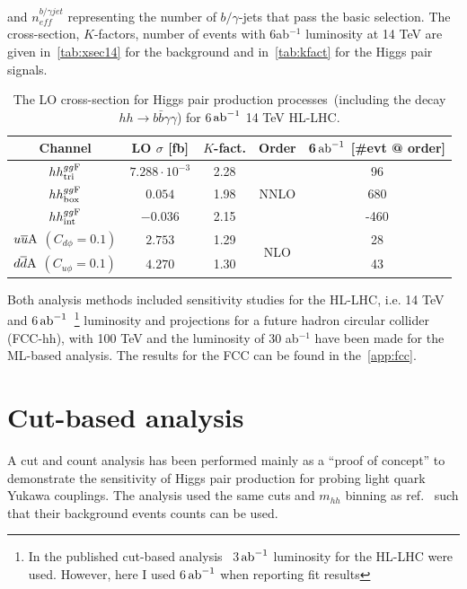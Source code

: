 and $n_{eff}^{b/\gamma jet}$ representing the number of $b/\gamma$-jets that pass the basic selection. The cross-section, $K$-factors, number of events with 6ab$^{-1}$ luminosity at 14 TeV are given in~\autoref{tab:xsec14} for the background and in~\autoref{tab:kfact} for the Higgs pair signals. 
\begin{table}[t]
	\centering
	\begin{tabular}{ccccc}
		\toprule
		Channel	        &LO $\sigma $ [fb]	&$K$-fact.	&Order&6$\,{\rm ab}^{-1}$ [\#evt @ order]   \\
		\midrule
		$hh^{gg\rm F}_{\rm tri}$	        &  $7.288 \cdot10^{-3}$    & 2.28 &\multirow{3}{*}{NNLO}   &  96   \\ 
		$hh^{gg\rm F}_{\rm box}$            & $0.054$    & 1.98 &  & 680   \\ 
		$hh^{gg\rm F}_{\rm int}$            &$-0.036$    & 2.15 &  &-460   \\ 
		$u\overline u \rm A$ $(C_{d\phi}=0.1)$ &  $2.753$    & 1.29&\multirow{2}{*}{NLO} &  28   \\ 
		$d\overline d \rm A$ $(C_{u\phi}=0.1)$ &  $4.270$    & 1.30 & &  43   \\ 
		\bottomrule
	\end{tabular}
	\caption{  The LO cross-section for Higgs pair production processes~(including the decay $hh \to b \bar b \gamma \gamma$) for 6$\,{\rm ab}^{-1}$ 14 TeV HL-LHC.}
	\label{tab:kfact}
\end{table}
Both analysis methods included sensitivity studies for the HL-LHC, i.e. 14 TeV and 6$\,{\rm ab}^{-1}$~\footnote{In the published cut-based analysis~\cite{Alasfar:2019pmn} 3$\,{\rm ab}^{-1}$ luminosity for the HL-LHC were used. However, here I used 6$\,{\rm ab}^{-1}$ when reporting fit results} luminosity and projections for a future hadron circular collider (FCC-hh), with 100 TeV and the luminosity of 30 ab$^{-1}$ have been made for the ML-based analysis. The results for the FCC can be found in the~\autoref{app:fcc}.

\section{Cut-based analysis \label{sec:cutbasedly}}
A cut and count analysis has been performed mainly as a ``proof of concept'' to demonstrate the sensitivity of Higgs pair production for probing light quark Yukawa couplings.  The analysis used the same cuts and $m_{hh}$ binning as ref.~\cite{Azatov:2015oxa} such that their background events counts can be used. 
